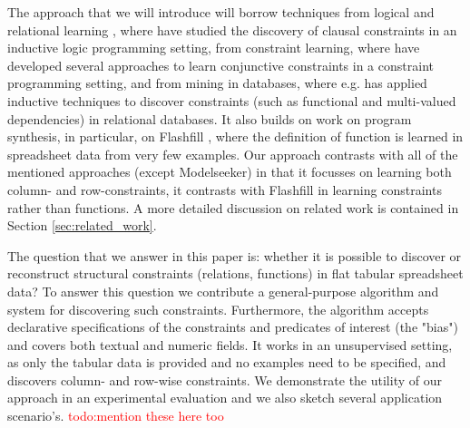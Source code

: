 \documentclass{sig-alternate-05-2015}
\newcommand{\tias}[1]{\textcolor{blue}{{\sc Tias:} #1}\xspace}
\newcommand{\luc}[1]{{\textcolor{red}{#1}}}
\begin{document}
The approach that we will introduce will borrow techniques from logical and relational learning \cite{luc_book}, where
\cite{claudien,lallouet} have studied the discovery of clausal constraints in an inductive logic programming setting, from constraint learning,  where \cite{Quacq,Conacq,modelseeker} have developed several approaches to learn conjunctive constraints in a constraint programming setting,
and from mining in databases,  where e.g. \cite{Shavlik} has applied inductive techniques to discover constraints (such as functional and multi-valued dependencies) in relational databases.  It also builds on work on program synthesis, in particular, on Flashfill \cite{flashfill}, where the definition of function is learned in spreadsheet data from
very few examples.  Our approach contrasts with all of the mentioned approaches (except Modelseeker) in that it focusses
on learning both column- and row-constraints, it contrasts with Flashfill in learning constraints rather than functions.
A more detailed discussion on related work is contained in Section \ref{sec:related_work}.






The question that we answer in this paper is: whether it is possible to discover or reconstruct structural constraints (relations, functions) in flat tabular spreadsheet data?
To answer this question we contribute a general-purpose algorithm and system for discovering such constraints. Furthermore, the algorithm accepts declarative specifications of the constraints and predicates of interest (the "bias") and covers both textual and numeric fields. It works in an unsupervised setting, as only the tabular data is provided and no examples need to be specified, and discovers column- and row-wise constraints.
We demonstrate the utility of our approach in an experimental evaluation and we also sketch several application scenario's.
\luc{todo:mention these here too}
\end{document}

